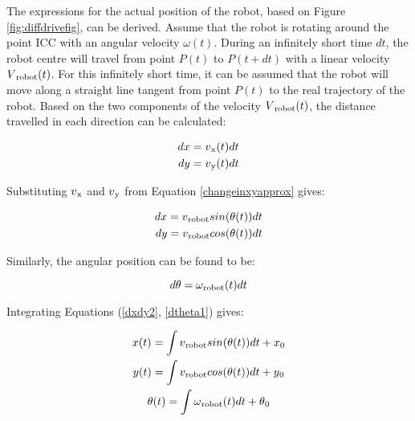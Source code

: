 The expressions for the actual position of the robot, based on Figure \ref{fig:diffdrivefig}, can be derived. Assume that the robot is rotating around the point ICC with an angular velocity $\omega(t)$. During an infinitely short time $dt$, the robot centre will travel from point $P(t)$ to $P(t+dt)$ with a linear velocity $V\textsubscript{robot}(t)$. For this infinitely short time, it can be assumed that the robot will move along a straight line tangent from point $P(t)$ to the real trajectory of the robot. Based on the two components of the velocity $V\textsubscript{robot}(t)$, the distance travelled in each direction can be calculated:

\begin{equation}\label{dxdy1}
\begin{split}
    dx = v\textsubscript{x}(t) dt
    \\
    dy = v\textsubscript{y}(t) dt
\end{split}
\end{equation}

Substituting $v\textsubscript{x}$ and $v\textsubscript{y}$ from Equation \ref{changeinxyapprox} gives:

\begin{equation}\label{dxdy2}
\begin{split}
    dx = v\textsubscript{robot}sin(\theta(t))dt
    \\
    dy = v\textsubscript{robot}cos(\theta(t))dt
\end{split}
\end{equation}

Similarly, the angular position can be found to be:

\begin{equation}\label{dtheta1}
    d\theta = \omega\textsubscript{robot}(t)dt
\end{equation}

Integrating Equations (\ref{dxdy2}, \ref{dtheta1}) gives:

\begin{equation}
\begin{gathered}
    x(t) = \int v\textsubscript{robot}sin(\theta(t))dt + x\textsubscript{0}
    \\
    y(t) = \int v\textsubscript{robot}cos(\theta(t))dt + y\textsubscript{0}
    \\
    \theta(t) = \int \omega\textsubscript{robot}(t)dt + \theta\textsubscript{0}
\end{gathered}
\end{equation}

